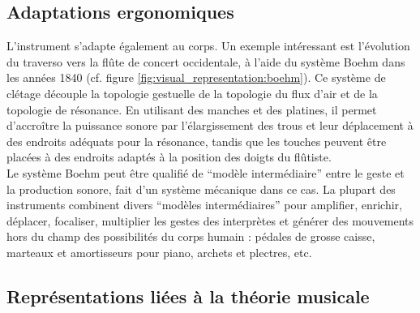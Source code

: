\subsection{Adaptations ergonomiques}


\noindent L'instrument s'adapte également au corps. Un exemple intéressant est l'évolution du traverso vers la flûte de concert occidentale, à l'aide du système Boehm dans les années 1840 (cf. figure \ref{fig:visual_representation:boehm}). Ce système de clétage découple la topologie gestuelle de la topologie du flux d'air et de la topologie de résonance. En utilisant des manches et des platines, il permet d'accroître la puissance sonore par l'élargissement des trous et leur déplacement à des endroits adéquats pour la résonance, tandis que les touches peuvent être placées à des endroits adaptés à la position des doigts du flûtiste.\\
\indent Le système Boehm peut être qualifié de ``modèle intermédiaire'' entre le geste et la production sonore, fait d'un système mécanique dans ce cas. La plupart des instruments combinent divers ``modèles intermédiaires'' pour amplifier, enrichir, déplacer, focaliser, multiplier les gestes des interprètes et générer des mouvements hors du champ des possibilités du corps humain : pédales de grosse caisse, marteaux et amortisseurs pour piano, archets et plectres, etc.

\subsection{Représentations liées à la théorie musicale}
\label{ch:visual_representation:music-theory}

